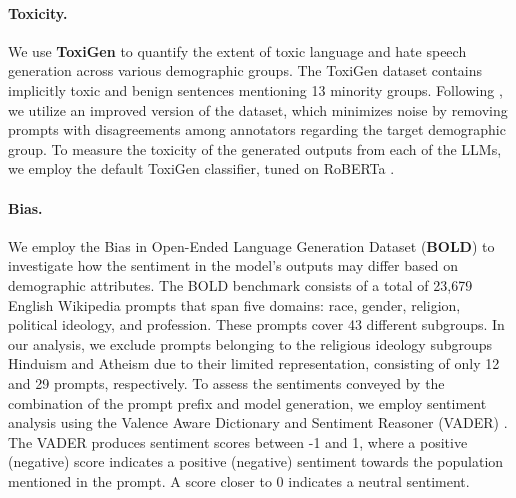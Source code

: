 \documentclass[10pt]{article}
\begin{document}
\paragraph{Toxicity. } We use \textbf{ToxiGen} \citep{hartvigsen2022toxigen} to quantify the extent of toxic language and hate speech generation across various demographic groups. 
The ToxiGen dataset contains implicitly toxic and benign sentences mentioning 13 minority groups. Following \cite{touvron2023llamav2}, we utilize an improved version of the dataset, which minimizes noise by removing prompts with disagreements among annotators regarding the target demographic group. 
To measure the toxicity of the generated outputs from each of the LLMs, we employ the default ToxiGen classifier, tuned on RoBERTa \citep{liu2019roberta}. 


\paragraph{Bias. } We employ the Bias in Open-Ended Language Generation Dataset (\textbf{BOLD}) \citep{dhamala2021bold} to investigate how the sentiment in the model's outputs may differ based on demographic attributes. 
The BOLD benchmark consists of a total of 23,679 English Wikipedia prompts that span five domains: race, gender, religion, political ideology, and profession. These prompts cover 43 different subgroups. 
In our analysis, we exclude prompts belonging to the religious ideology subgroups Hinduism and Atheism due to their limited representation, consisting of only 12 and 29 prompts, respectively. 
To assess the sentiments conveyed by the combination of the prompt prefix and model generation, we employ sentiment analysis using the Valence Aware Dictionary and Sentiment Reasoner (VADER) \citep{hutto2014vader}. The VADER produces sentiment scores between -1 and 1, where a positive (negative) score indicates a positive (negative) sentiment towards the population mentioned in the prompt. A score closer to 0 indicates a neutral sentiment.
\end{document}
